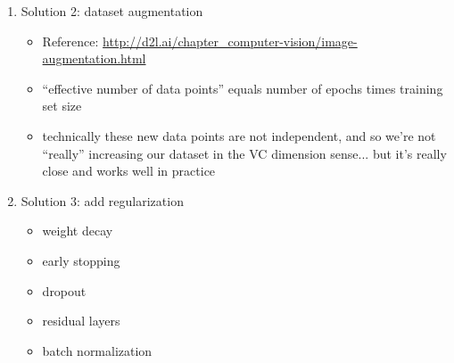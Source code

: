 \documentclass[10pt]{exam}
\theoremstyle{definition}
\newtheorem{problem}{Problem}
\begin{document}
\begin{enumerate}
        \newpage
\item
Solution 2: dataset augmentation

        \begin{itemize}
            \item Reference: \url{http://d2l.ai/chapter_computer-vision/image-augmentation.html}

            \item ``effective number of data points'' equals number of epochs times training set size

            \item technically these new data points are not independent,
  and so we're not ``really'' increasing our dataset in the VC dimension sense... but it's really close and works well in practice

        \end{itemize}

  \item
Solution 3: add regularization
        \begin{itemize}
            \item weight decay
            \item early stopping
            \item dropout
            \item residual layers
            \item batch normalization
        \end{itemize}

\end{enumerate}

%
\end{document}
